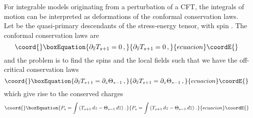 \documentclass[a4paper,12pt]{report}
\begin{document}
For integrable models originating from a perturbation of a CFT, the integrals of motion can be interpreted as
deformations of the conformal conservation laws. Let \coordHE{} be the quasi-primary descendants of the
stress-energy tensor, with spin \coordHE{}. The conformal conservation laws are
\begin{equation}\coord{}\boxEquation{
\partial _{\overline{z}}T_{s+1}=0 \,,
}{
\partial _{\overline{z}}T_{s+1}=0 \,,
}{ecuacion}\coordE{}\end{equation}
and the problem is to find the spins \coordHE{} and the local fields \coordHE{} such that we have the off-critical
conservation laws
\begin{equation}\coord{}\boxEquation{\label{offcritcons}
\partial _{\overline{z}}T_{s+1}=\partial _{z}\Theta _{s-1}\,,
}{\partial _{\overline{z}}T_{s+1}=\partial _{z}\Theta _{s-1}\,,
}{ecuacion}\coordE{}\end{equation}
which give rise to the conserved charges
\begin{equation}\coord{}\boxEquation{
P_{s}=\int\left(T_{s+1}\, dz -\Theta _{s-1} \, d\overline{z} \right)\,.
}{
P_{s}=\int\left(T_{s+1}\, dz -\Theta _{s-1} \, d\overline{z} \right)\,.
}{ecuacion}\coordE{}\end{equation}

\vspace{0.5cm}
\end{document}
